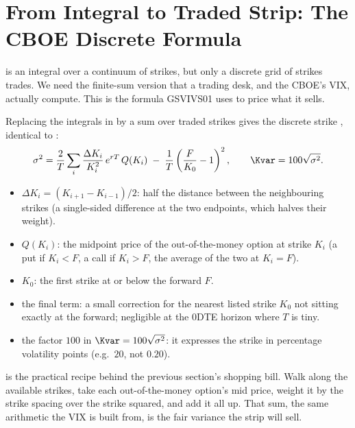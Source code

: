\section{From Integral to Traded Strip: The CBOE Discrete Formula}
\label{sec:gsvivs:cboe-discrete}

 is an integral over a continuum of strikes, but only a discrete grid of strikes trades. We need the finite-sum version that a trading desk, and the CBOE's VIX, actually compute. This is the formula GSVIVS01 uses to price what it sells.

Replacing the integrals in  by a sum over traded strikes gives the discrete strike \citep[as in the VIX construction,][]{CarrLee2009}, identical to :
\begin{equation}
\label{eq:gsvivs:cboe}
\sigma^2 = \frac{2}{T}\sum_i \frac{\Delta K_i}{K_i^2}\,e^{rT}\,Q(K_i) \;-\; \frac{1}{T}\left(\frac{F}{K_0} - 1\right)^2 ,
\qquad \Kvar = 100\sqrt{\sigma^2}.
\end{equation}
\begin{itemize}
  \item $\Delta K_i = (K_{i+1} - K_{i-1})/2$: half the distance between the neighbouring strikes (a single-sided difference at the two endpoints, which halves their weight).
  \item $Q(K_i)$: the midpoint price of the out-of-the-money option at strike $K_i$ (a put if $K_i < F$, a call if $K_i > F$, the average of the two at $K_i = F$).
  \item $K_0$: the first strike at or below the forward $F$.
  \item the final term: a small correction for the nearest listed strike $K_0$ not sitting exactly at the forward; negligible at the 0DTE horizon where $T$ is tiny.
  \item the factor $100$ in $\Kvar = 100\sqrt{\sigma^2}$: it expresses the strike in percentage volatility points (e.g.\ $20$, not $0.20$).
\end{itemize}

\begin{intuition}
 is the practical recipe behind the previous section's shopping bill. Walk along the available strikes, take each out-of-the-money option's mid price, weight it by the strike spacing over the strike squared, and add it all up. That sum, the same arithmetic the VIX is built from, is the fair variance the strip will sell.
\end{intuition}

